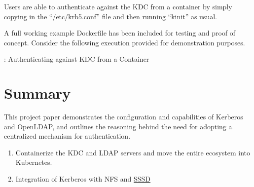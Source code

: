 \vspace{2mm}
\vspace{2mm}

\justifying
Users are able to authenticate against the KDC from a container by simply copying in the ``/etc/krb5.conf'' file and then running ``kinit'' as usual.

\justifying
A full working example Dockerfile has been included for testing and proof of concept. Consider the following execution provided for demonstration purposes.

\begin{mybox}{\thetcbcounter: Authenticating against KDC from a Container}
	
\end{mybox}

\section{\label{sec:summary}Summary}

\justifying
This project paper demonstrates the configuration and capabilities of Kerberos and OpenLDAP, and outlines the reasoning behind the need for adopting a
centralized mechanism for authentication.

\vspace{2mm}
\vspace{2mm}

\begin{raggedright}
	\begin{enumerate}
		\item Containerize the KDC and LDAP servers and move the entire ecosystem into Kubernetes.
		\item Integration of Kerberos with NFS and \href{https://sssd.io/}{SSSD}
	\end{enumerate}
\end{raggedright}


\clearpage
\begin{versionhistory}
\end{versionhistory}
\nocite{*}


% 


